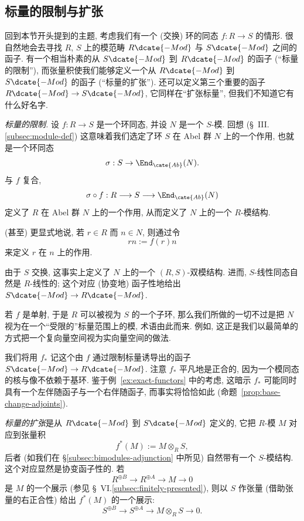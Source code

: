 \subsection{标量的限制与扩张}
\label{subsec:restriction-extension-scalars}

回到本节开头提到的主题, 考虑我们有一个 (交换) 环的同态 $f:R\to S$ 的情形. 很自然地会去寻找 $R$, $S$ 上的模范畴 $R\dcate{-Mod}$ 与 $S\dcate{-Mod}$ 之间的函子. 有一个相当朴素的从 $S\dcate{-Mod}$ 到 $R\dcate{-Mod}$ 的函子 (``标量的限制''), 而张量积使我们能够定义一个从 $R\dcate{-Mod}$ 到 $S\dcate{-Mod}$ 的函子 (``标量的扩张''). 还可以定义第三个重要的函子 $R\dcate{-Mod}\to S\dcate{-Mod}$, 它同样在``扩张标量'', 但我们不知道它有什么好名字.

\emph{标量的限制.} 设 $f:R\to S$ 是一个环同态, 并设 $N$ 是一个 $S$-模. 回想 (\S~III.\ref{subsec:module-def}) 这意味着我们选定了环 $S$ 在 Abel 群 $N$ 上的一个作用, 也就是一个环同态
\[
\sigma:S\to\End_{\cate{Ab}}(N).
\]
与 $f$ 复合,
\[
\sigma\circ f:R\longrightarrow S\longrightarrow\End_{\cate{Ab}}(N)
\]
定义了 $R$ 在 Abel 群 $N$ 上的一个作用, 从而定义了 $N$ 上的一个 $R$-模结构.

(甚至) 更显式地说, 若 $r\in R$ 而 $n\in N$, 则通过令
\[
rn:=f(r)n
\]
来定义 $r$ 在 $n$ 上的作用.

由于 $S$ 交换, 这事实上定义了 $N$ 上的一个 $(R,S)$-双模结构. 进而, $S$-线性同态自然是 $R$-线性的; 这个对应 (协变地) 函子性地给出 $S\dcate{-Mod}\to R\dcate{-Mod}$.

若 $f$ 是单射, 于是 $R$ 可以被视为 $S$ 的一个子环, 那么我们所做的一切不过是把 $N$ 视为在一个``受限的''标量范围上的模, 术语由此而来. 例如, 这正是我们以最简单的方式把一个复向量空间视为实向量空间的做法.

我们将用 $f_*$ 记这个由 $f$ 通过限制标量诱导出的函子 $S\dcate{-Mod}\to R\dcate{-Mod}$. 注意 $f_*$ 平凡地是正合的, 因为一个模同态的核与像不依赖于基环. 鉴于例~\ref{ex:exact-functors} 中的考虑, 这暗示 $f_*$ 可能同时具有一个左伴随函子与一个右伴随函子, 而事实将恰恰如此 (命题~\ref{prop:base-change-adjoints}).

\emph{标量的扩张}是从 $R\dcate{-Mod}$ 到 $S\dcate{-Mod}$ 定义的, 它把 $R$-模 $M$ 对应到张量积
\[
f^*(M):=M\otimes_R S,
\]
后者 (如我们在 \S\ref{subsec:bimodules-adjunction} 中所见) 自然带有一个 $S$-模结构. 这个对应显然是协变函子性的. 若
\[
R^{\oplus B}\longrightarrow R^{\oplus A}\longrightarrow M\longrightarrow 0
\]
是 $M$ 的一个展示 (参见 \S~VI.\ref{subsec:finitely-presented}), 则以 $S$ 作张量 (借助张量的右正合性) 给出 $f^*(M)$ 的一个展示:
\[
S^{\oplus B}\longrightarrow S^{\oplus A}\longrightarrow M\otimes_R S\longrightarrow 0.
\]

